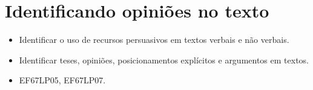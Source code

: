 \pagestyle{port}
\chapter{Identificando opiniões no texto}


\begin{itemize}

  \item Identificar o uso de recursos persuasivos em textos verbais e
não verbais.

  \item Identificar teses, opiniões, posicionamentos explícitos e argumentos em textos.

\end{itemize}


\begin{itemize}

  \item EF67LP05, EF67LP07.

\end{itemize}

